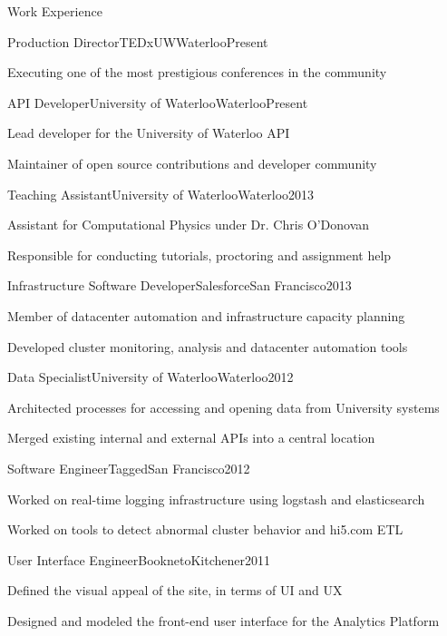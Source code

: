 \documentclass[oneside]{resume}
\begin{document}
  \begin{rSection}{Work Experience}

    \begin{rSubsection}{Production Director}{TEDxUW}{Waterloo}{Present}
      \item Executing one of the most prestigious conferences in the community
    \end{rSubsection}

    \begin{rSubsection}{API Developer}{University of Waterloo}{Waterloo}{Present}
      \item Lead developer for the University of Waterloo API
      \item Maintainer of open source contributions and developer community
    \end{rSubsection}

    \begin{rSubsection}{Teaching Assistant}{University of Waterloo}{Waterloo}{2013}
      \item Assistant for Computational Physics under Dr. Chris O'Donovan
      \item Responsible for conducting tutorials, proctoring and assignment help
    \end{rSubsection}

    \begin{rSubsection}{Infrastructure Software Developer}{Salesforce}{San Francisco}{2013}
      \item Member of datacenter automation and infrastructure capacity planning
      \item Developed cluster monitoring, analysis and datacenter automation tools
    \end{rSubsection}

    \begin{rSubsection}{Data Specialist}{University of Waterloo}{Waterloo}{2012}
      \item Architected processes for accessing and opening data from University systems
      \item Merged existing internal and external APIs into a central location
    \end{rSubsection}

    \begin{rSubsection}{Software Engineer}{Tagged}{San Francisco}{2012}
      \item Worked on real-time logging infrastructure using logstash and elasticsearch
      \item Worked on tools to detect abnormal cluster behavior and hi5.com ETL
    \end{rSubsection}

    \begin{rSubsection}{User Interface Engineer}{Bookneto}{Kitchener}{2011}
      \item Defined the visual appeal of the site, in terms of UI and UX
      \item Designed and modeled the front-end user interface for the Analytics Platform
    \end{rSubsection}

  \end{rSection}
\end{document}
